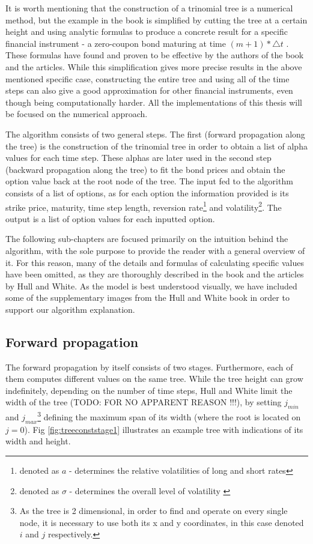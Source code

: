 It is worth mentioning that the construction of a trinomial tree is a numerical method, but the example in the book is simplified by cutting the tree at a certain height and using analytic formulas to produce a concrete result for a specific financial instrument - a zero-coupon bond maturing at time $(m + 1) * \triangle t$ \cite[pg. 704]{ofod}. These formulas have found and proven to be effective by the authors of the book and the articles. While this simplification gives more precise results in the above mentioned specific case, constructing the entire tree and using all of the time steps can also give a good approximation for other financial instruments, even though being computationally harder. All the implementations of this thesis will be focused on the numerical approach.

The algorithm consists of two general steps. The first (forward propagation along the tree) is the construction of the trinomial tree in order to obtain a list of alpha values for each time step. These alphas are later used in the second step (backward propagation along the tree) to fit the bond prices and obtain the option value back at the root node of the tree. The input fed to the algorithm consists of a list of options, as for each option the information provided is its strike price, maturity, time step length, reversion rate\footnote{denoted as $a$ - determines the relative volatilities of long and short rates\cite[pg.9]{npfits}} and volatility\footnote{denoted as $\sigma$ - determines the overall level of volatility \cite[pg. 9]{npfits}}. The output is a list of option values for each inputted option. 

The following sub-chapters are focused primarily on the intuition behind the algorithm, with the sole purpose to provide the reader with a general overview of it. For this reason, many of the details and formulas of calculating specific values have been omitted, as they are thoroughly described in the book and the articles by Hull and White. As the model is best understood visually, we have included some of the supplementary images from the Hull and White book in order to support our algorithm explanation. 

\subsection{Forward propagation}
The forward propagation by itself consists of two stages. Furthermore, each of them computes different values on the same tree. While the tree height can grow indefinitely, depending on the number of time steps, Hull and White limit the width of the tree (TODO: FOR NO APPARENT REASON !!!), by setting $j_{min}$ and $j_{max}$\footnote{As the tree is 2 dimensional, in order to find and operate on every single node, it is necessary to use both its x and y coordinates, in this case denoted $i$ and $j$ respectively.} defining the maximum span of its width (where the root is located on $j=0$). Fig \ref{fig:treeconststage1} illustrates an example tree with indications of its width and height. 


